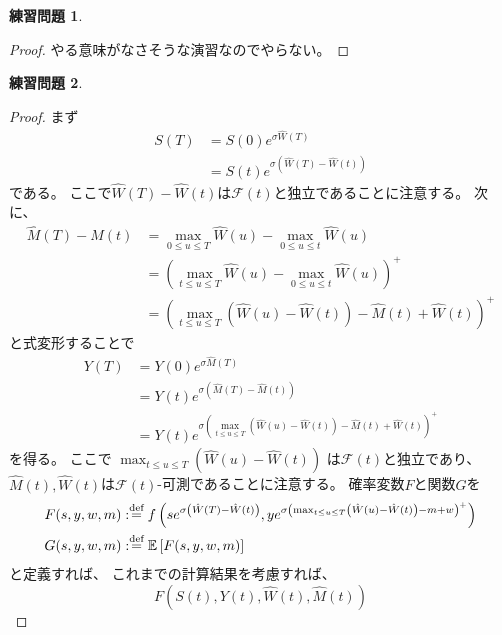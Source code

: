 \documentclass[uplatex]{jsarticle}
\theoremstyle{definition}
\newtheorem{prob}[prob]{練習問題}
\def\E{\mathbb{E}}
\def\mcF{\mathcal{F}}
\def\dfn{:\overset{\mbox{{\scriptsize def}}}{=}}
\begin{document}
\begin{prob}\label{prob: 7.2}
\end{prob}

\begin{proof}
  やる意味がなさそうな演習なのでやらない。
\end{proof}



\begin{prob}\label{prob: 7.3}
\end{prob}

\begin{proof}
  まず
  \begin{align*}
    S(T)
    &= S(0)e^{\sigma\hat{W}(T)} \\
    &= S(t)e^{\sigma \left( \hat{W}(T) - \hat{W}(t)\right) }
  \end{align*}
  である。
  ここで\(\hat{W}(T) - \hat{W}(t)\)は\(\mcF(t)\)と独立であることに注意する。
  次に、
  \begin{align*}
    \hat{M}(T) - \hat{M}(t)
    &= \max_{0\leq u\leq T}\hat{W}(u) - \max_{0\leq u\leq t}\hat{W}(u) \\
    &= \left( \max_{t\leq u\leq T}\hat{W}(u)
    - \max_{0\leq u\leq t}\hat{W}(u) \right)^+ \\
    &= \left( \max_{t\leq u\leq T}\left( \hat{W}(u) - \hat{W}(t)\right)
    - \hat{M}(t) + \hat{W}(t)\right)^+
  \end{align*}
  と式変形することで
  \begin{align*}
    Y(T) &= Y(0)e^{\sigma \hat{M}(T)} \\
    &= Y(t)e^{\sigma \left( \hat{M}(T) - \hat{M}(t)\right)} \\
    &= Y(t)e^{ \sigma \left(
    \max_{t\leq u\leq T}\left( \hat{W}(u) - \hat{W}(t)\right)
    - \hat{M}(t) + \hat{W}(t) \right)^+ }
  \end{align*}
  を得る。
  ここで
  \(\max_{t\leq u\leq T}\left( \hat{W}(u) - \hat{W}(t)\right)\)
  は\(\mcF(t)\)と独立であり、
  \(\hat{M}(t),\hat{W}(t)\)は\(\mcF(t)\)-可測であることに注意する。
  確率変数\(F\)と関数\(G\)を
  \begin{align*}
    &F(s,y,w,m) \dfn
    f\left( se^{\sigma \left( \hat{W}(T)-\hat{W}(t)\right)},
    ye^{ \sigma \left(
    \max_{t\leq u\leq T}\left( \hat{W}(u) - \hat{W}(t)\right)
    - m + w \right)^+ } \right) \\
    &G(s,y,w,m) \dfn \E\left[ F(s,y,w,m)\right]
  \end{align*}
  と定義すれば、
  これまでの計算結果を考慮すれば、
  \[
  F(S(t),Y(t),\hat{W}(t),\hat{M}(t))
\]
\end{proof}
\end{document}
